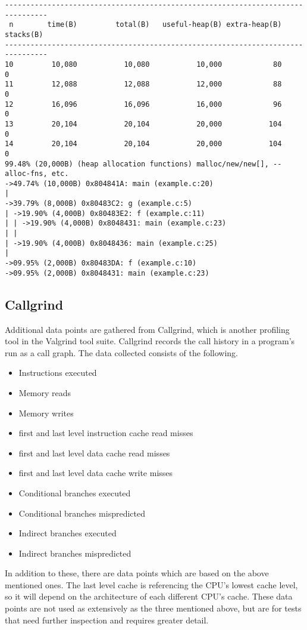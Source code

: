 \begin{lstlisting}[basicstyle=\footnotesize, caption=Massif output example, label=lst:allocate]
--------------------------------------------------------------------------------
 n        time(B)         total(B)   useful-heap(B) extra-heap(B)    stacks(B)
--------------------------------------------------------------------------------
10         10,080           10,080           10,000            80            0
11         12,088           12,088           12,000            88            0
12         16,096           16,096           16,000            96            0
13         20,104           20,104           20,000           104            0
14         20,104           20,104           20,000           104            0
99.48% (20,000B) (heap allocation functions) malloc/new/new[], --alloc-fns, etc.
->49.74% (10,000B) 0x804841A: main (example.c:20)
| 
->39.79% (8,000B) 0x80483C2: g (example.c:5)
| ->19.90% (4,000B) 0x80483E2: f (example.c:11)
| | ->19.90% (4,000B) 0x8048431: main (example.c:23)
| |   
| ->19.90% (4,000B) 0x8048436: main (example.c:25)
|   
->09.95% (2,000B) 0x80483DA: f (example.c:10)
->09.95% (2,000B) 0x8048431: main (example.c:23)
\end{lstlisting}

\subsection{Callgrind}
Additional data points are gathered from Callgrind, which is another profiling tool in the Valgrind tool suite.
Callgrind records the call history in a program's run as a call graph.
The data collected consists of the following.

\begin{itemize}
	\item Instructions executed
	\item Memory reads
	\item Memory writes
	\item first and last level instruction cache read misses
	\item first and last level data cache read misses
	\item first and last level data cache write misses
	\item Conditional branches executed
	\item Conditional branches mispredicted
	\item Indirect branches executed
	\item Indirect branches mispredicted
\end{itemize}

In addition to these, there are data points which are based on the above mentioned ones.
The last level cache is referencing the CPU's lowest cache level, so it will depend on the architecture of each different CPU's cache.
These data points are not used as extensively as the three mentioned above, but are for tests that need further inspection and requires greater detail.
